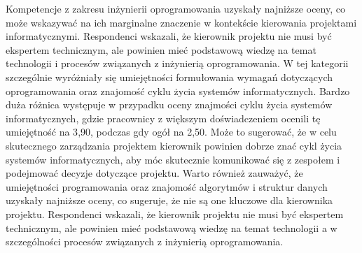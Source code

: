 Kompetencje z zakresu inżynierii oprogramowania uzyskały najniższe oceny, co może wskazywać na ich marginalne znaczenie w kontekście kierowania projektami informatycznymi. Respondenci wskazali, że kierownik projektu nie musi być ekspertem technicznym, ale powinien mieć podstawową wiedzę na temat technologii i procesów związanych z inżynierią oprogramowania. W tej kategorii szczególnie wyróżniały się umiejętności formułowania wymagań dotyczących oprogramowania oraz znajomość cyklu życia systemów informatycznych. Bardzo duża różnica występuje w przypadku oceny znajmości cyklu życia systemów informatycznych, gdzie pracownicy z większym doświadczeniem ocenili tę umiejętność na 3{,}90, podczas gdy ogół na 2{,}50. Może to sugerować, że w celu skutecznego zarządzania projektem kierownik powinien dobrze znać cykl życia systemów informatycznych, aby móc skutecznie komunikować się z zespołem i podejmować decyzje dotyczące projektu. Warto również zauważyć, że umiejętności programowania oraz znajomość algorytmów i struktur danych uzyskały najniższe oceny, co sugeruje, że nie są one kluczowe dla kierownika projektu. Respondenci wskazali, że kierownik projektu nie musi być ekspertem technicznym, ale powinien mieć podstawową wiedzę na temat technologii a w szczególności procesów związanych z inżynierią oprogramowania.

